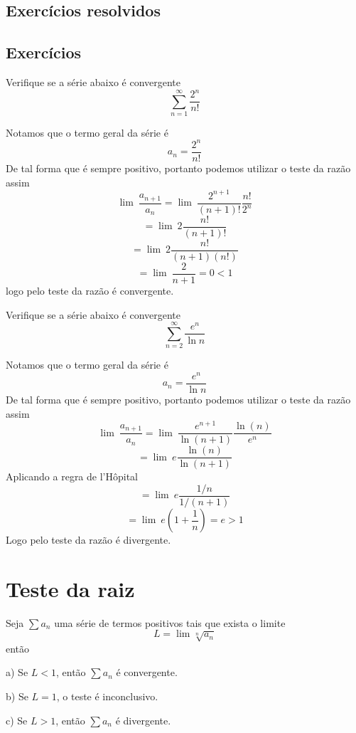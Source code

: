\subsection*{Exercícios resolvidos}

\construirExeresol


\subsection*{Exercícios}

\construirExer

\begin{exer}
    Verifique se a série abaixo é convergente 
    $$\sum_{n =1}^{\infty} \frac{2^n}{n!}$$
\end{exer}

\begin{resp}
    Notamos que o termo geral da série é 
    $$a_n = \frac{2^n}{n!} $$
    De tal forma que é sempre positivo, portanto podemos utilizar o teste da
    razão assim
    $$ \lim{\:} \frac{a_{n+1}}{a_n} = \lim{\:} \frac{2^{n+1}}{(n+1)!} \frac{n!}{2^n}$$
    $$ = \lim{\:} 2 \frac{n!}{(n+1)!}$$
    $$ = \lim{\:} 2 \frac{n!}{(n+1)(n!)}$$
    $$ = \lim{\:} \frac{2}{n+1} = 0 < 1 $$
    logo pelo teste da razão é convergente.
\end{resp}

\begin{exer}
    Verifique se a série abaixo é convergente 
    $$\sum_{n =2}^{\infty} \frac{e^n}{\ln n}$$
\end{exer}

\begin{resp}
    Notamos que o termo geral da série é 
    $$a_n = \frac{e^n}{\ln n} $$
    De tal forma que é sempre positivo, portanto podemos utilizar o teste da razão
    assim
    $$ \lim{\:} \frac{a_{n+1}}{a_n} = \lim{\:} \frac{e^{n+1}}{\ln (n+1)} \frac{\ln (n)}{e^n}$$
    $$ = \lim{\:} e \frac{\ln (n)}{\ln(n+1)}$$
    Aplicando a regra de l'Hôpital
    $$ = \lim{\:} e \frac{1/n}{1/(n+1)}$$
    $$ = \lim{\:} e (1+ \frac{1}{n}) = e > 1$$
    Logo pelo teste da razão é divergente.
\end{resp}


\section{Teste da raiz}
\construirSec

\begin{teo}
    Seja $\sum a_n$ uma série de termos positivos tais que exista o limite
    $$L = \lim \sqrt[n]{a_n} $$
    então
    \item [a)] Se $L < 1$, então $\sum a_n$ é convergente.
    \item [b)] Se $L = 1$, o teste é inconclusivo.
    \item [c)] Se $L > 1$, então $\sum a_n$ é divergente.
\end{teo}

